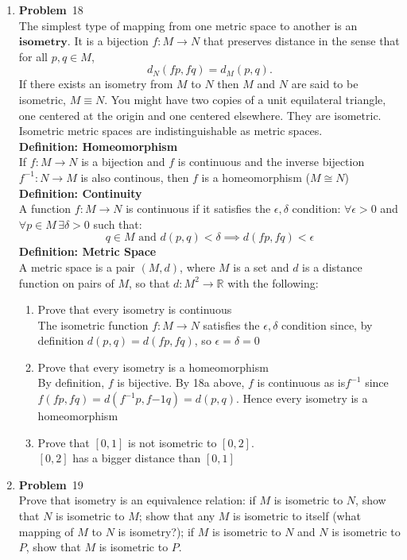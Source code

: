 \documentclass[12pt]{amsart}
\newcommand{\benu}{\begin{enumerate}}
\newcommand{\eenu}{\end{enumerate}}
\theoremstyle{definition}
\newcommand{\mbR}{\mathbb{R}}
\newcommand{\itep}{\item {\bfseries Problem}\ }
\begin{document}
\begin{enumerate}[series=p]
\itep 18\\
The simplest type of mapping from one metric space to another is an $\textbf{isometry}$.  It is a bijection $f:M \rightarrow N$ that preserves distance in the sense that for all $p,q \in M$,
$$d_N(fp, fq) = d_M(p,q).$$
If there exists an isometry from $M$ to $N$ then $M$ and $N$ are said to be isometric, $M \equiv N$.  You might have two copies of a unit equilateral triangle, one centered at the origin and one centered elsewhere.  They are isometric.  Isometric metric spaces are indistinguishable as metric spaces.
\\
\textbf{Definition: Homeomorphism}\\
If $f:M \to N$ is a bijection and $f$ is continuous and the inverse bijection $f^{-1}: N \to M$ is also continous, then $f$ is a homeomorphism ($M \cong N$)
\\
\textbf{Definition: Continuity}\\
A function $f: M \to N$ is continuous if it satisfies the $\epsilon , \delta$ condition: $\forall \epsilon > 0$ and $\forall p \in M \, \exists \delta > 0$ such that:\\
$$ q \in M \text{ and } d(p,q) < \delta \implies d(fp, fq) < \epsilon$$
\textbf{Definition: Metric Space}\\
A metric space is a pair $(M, d)$, where $M$ is a set and $d$ is a distance function on pairs of $M$, so that $d : M^2 \to \mbR$ with the following:
\\
\benu
\item Prove that every isometry is continuous\\
The isometric function $f: M \to N$ satisfies the $\epsilon , \delta$ condition since, by definition $d(p, q) = d(fp, fq)$, so $\epsilon = \delta = 0$
\item Prove that every isometry is a homeomorphism\\
By definition, $f$ is bijective.  By 18a above, $f$ is continuous as is$f^{-1}$ since $f(fp, fq) = d(f^{-1}p, f{-1}q) = d(p,q)$.  Hence every isometry is a homeomorphism
\item Prove that $[0,1]$ is not isometric to $[0,2]$.\\
$[0,2]$ has a bigger distance than $[0,1]$\hfill\lightning
\eenu
\newpage
\itep 19\\
Prove that isometry is an equivalence relation: if $M$ is isometric to $N$, show that $N$ is isometric to $M$; show that any $M$ is isometric to itself (what mapping of $M$ to $N$ is isometry?); if $M$ is isometric to $N$ and $N$ is isometric to $P$, show that $M$ is isometric to $P$.

\end{enumerate}
\end{document}
